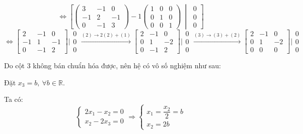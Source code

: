 \documentclass[12pt,a4paper]{article}
\newcommand{\R}{\mathbb{R}}
\begin{document}
\[
\Leftrightarrow
\left[\begin{pmatrix}3 & -1 & 0\\ -1 & 2 & -1\\ 0 & -1 & 3\end{pmatrix}-1\begin{pmatrix}1&0&0\\0&1&0\\0&0&1\end{pmatrix}\ \middle|\ \begin{matrix}0\\0\\0\end{matrix}\right]
\]
\[
\Leftrightarrow
\begin{bmatrix}2 & -1 & 0\\ -1 & 1 & -1\\ 0 & -1 & 2\end{bmatrix}\big|\begin{matrix}0\\0\\0\end{matrix}
\xrightarrow{(2)\to 2(2)+(1)}
\begin{bmatrix}2 & -1 & 0\\ 0 & 1 & -2\\ 0 & -1 & 2\end{bmatrix}\big|\begin{matrix}0\\0\\0\end{matrix}
\xrightarrow{(3)\to(3)+(2)}
\begin{bmatrix}2 & -1 & 0\\ 0 & 1 & -2\\ 0 & 0 & 0\end{bmatrix}\big|\begin{matrix}0\\0\\0\end{matrix}
\]

Do cột 3 không bán chuẩn hóa được, nên hệ có vô số nghiệm như sau:

Đặt $x_3=b,\ \forall b\in\R$.

Ta có:
\[
\begin{cases}2x_1-x_2=0\\ x_2-2x_3=0\end{cases}
\Rightarrow
\begin{cases}x_1=\dfrac{x_2}{2}=b\\ x_2=2b\end{cases}
\]
\end{document}
